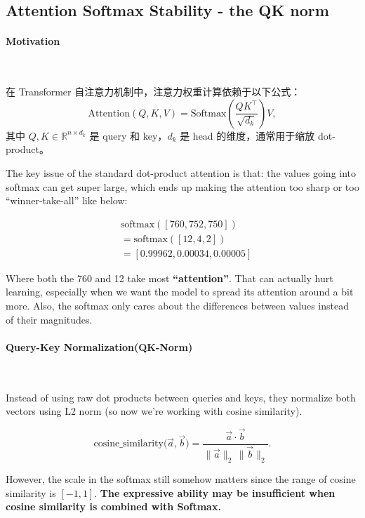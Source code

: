 \clearpage
\subsection{Attention Softmax Stability - the QK norm}

\paragraph{\textbf{Motivation}}~{}

在 Transformer 自注意力机制中，注意力权重计算依赖于以下公式：
\[
\mathrm{Attention}(Q,K,V) = \mathrm{Softmax}\!\left(\frac{QK^\top}{\sqrt{d_k}}\right) V,
\]
其中 $Q, K \in \mathbb{R}^{n \times d_k}$ 是 query 和 key，$d_k$ 是 head 的维度，通常用于缩放 dot-product。

The key issue of the standard dot-product attention is that: the values going into softmax can get super large, which ends up making the attention too sharp or too “winner-take-all” like below:

{
\begin{align*}
&\text{softmax}([760, 752, 750])\\
&= \text{softmax}([12, 4, 2])\\
&=[0.99962, 0.00034, 0.00005]
\end{align*}  

Where both the 760 and 12 take most \textbf{“attention”}. That can actually hurt learning, especially when we want the model to spread its attention around a bit more. Also, the softmax only cares about the differences between values instead of their magnitudes.

}

\paragraph{Query-Key Normalization(QK-Norm)}~{}

Instead of using raw dot products between queries and keys, they normalize both vectors using L2 norm (so now we're working with cosine similarity).

\[
\text{cosine\_similarity}\!\big(\vec{a}, \vec{b}\big) 
= \frac{\vec{a} \cdot \vec{b}}{\|\vec{a}\|_2 \, \|\vec{b}\|_2}.
\]

However, the scale in the softmax still somehow matters since the range of cosine similarity is $[-1, 1]$. 
\textbf{The expressive ability may be insufficient when cosine similarity is combined with Softmax. }


